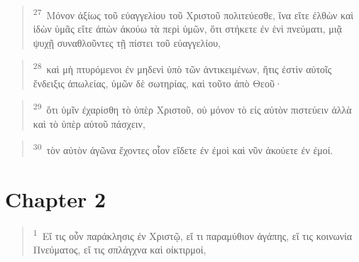\documentclass{article}
\newcommand{\currentverse}{1} %
\newcommand{\setcurrentverse}[1]{\renewcommand{\currentverse}{#1}}
\begin{document}
\begin{verse}

\setcurrentverse{27}

\setcounter{footnote}{0}

\textsuperscript{27}~Μόνον ἀξίως τοῦ εὐαγγελίου τοῦ Χριστοῦ πολιτεύεσθε, ἵνα εἴτε ἐλθὼν καὶ ἰδὼν ὑμᾶς εἴτε ἀπὼν ἀκούω τὰ περὶ ὑμῶν, ὅτι στήκετε ἐν ἑνὶ πνεύματι, μιᾷ ψυχῇ συναθλοῦντες τῇ πίστει τοῦ εὐαγγελίου,

\end{verse}

\begin{verse}

\setcurrentverse{28}

\setcounter{footnote}{0}

\textsuperscript{28}~καὶ μὴ πτυρόμενοι ἐν μηδενὶ ὑπὸ τῶν ἀντικειμένων, ἥτις ἐστὶν αὐτοῖς ἔνδειξις ἀπωλείας, ὑμῶν δὲ σωτηρίας, καὶ τοῦτο ἀπὸ Θεοῦ·

\end{verse}

\begin{verse}

\setcurrentverse{29}

\setcounter{footnote}{0}

\textsuperscript{29}~ὅτι ὑμῖν ἐχαρίσθη τὸ ὑπὲρ Χριστοῦ, οὐ μόνον τὸ εἰς αὐτὸν πιστεύειν ἀλλὰ καὶ τὸ ὑπὲρ αὐτοῦ πάσχειν,

\end{verse}

\begin{verse}

\setcurrentverse{30}

\setcounter{footnote}{0}

\textsuperscript{30}~τὸν αὐτὸν ἀγῶνα ἔχοντες οἷον εἴδετε ἐν ἐμοὶ καὶ νῦν ἀκούετε ἐν ἐμοί.

\end{verse}

\section*{Chapter 2}

\begin{verse}

\setcurrentverse{1}

\setcounter{footnote}{0}

\textsuperscript{1}~Εἴ τις οὖν παράκλησις ἐν Χριστῷ, εἴ τι παραμύθιον ἀγάπης, εἴ τις κοινωνία Πνεύματος, εἴ τις σπλάγχνα καὶ οἰκτιρμοί,

\end{verse}
\end{document}
